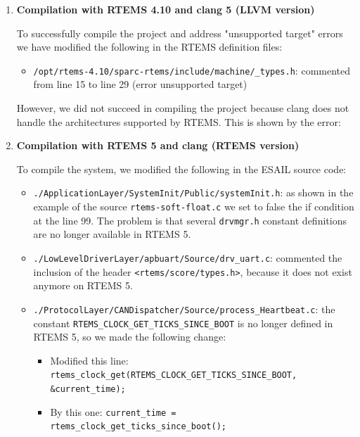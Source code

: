 \begin{enumerate}
	\item \textbf{Compilation with RTEMS 4.10 and clang 5 (LLVM version)}

	To successfully compile the project and address "unsupported target" errors we have modified the following in the RTEMS definition files:

	\begin{itemize}
		\item \texttt{/opt/rtems-4.10/sparc-rtems/include/machine/\_types.h}: commented from line 15 to line 29 (error unsupported target)
	\end{itemize}

	However, we did not succeed in compiling the project because clang does not handle the architectures supported by RTEMS. This is shown by the error:

	

	\item \textbf{Compilation with RTEMS 5 and clang (RTEMS version)}

	To compile the system, we modified the following in the ESAIL source code:

	\begin{itemize}
		\item \texttt{./ApplicationLayer/SystemInit/Public/systemInit.h}: as shown in the example of the source \texttt{rtems-soft-float.c} we set to false the if condition at the line 99. The problem is that several \texttt{drvmgr.h} constant definitions are no longer available in RTEMS 5.
		
		\item \texttt{./LowLevelDriverLayer/apbuart/Source/drv\_uart.c}: commented the inclusion of the header \texttt{\textless rtems/score/types.h\textgreater}, because it does not exist anymore on RTEMS 5.

		\item \texttt{./ProtocolLayer/CANDispatcher/Source/process\_Heartbeat.c}: the constant \texttt{RTEMS\_CLOCK\_GET\_TICKS\_SINCE\_BOOT} is no longer defined in RTEMS 5, so we made the following change:
		
		\begin{itemize}
			\item Modified this line: \texttt{rtems\_clock\_get(RTEMS\_CLOCK\_GET\_TICKS\_SINCE\_BOOT, \&current\_time);}
			\item By this one:        \texttt{current\_time = rtems\_clock\_get\_ticks\_since\_boot();}
		\end{itemize}
		

\end{itemize}
\end{enumerate}
